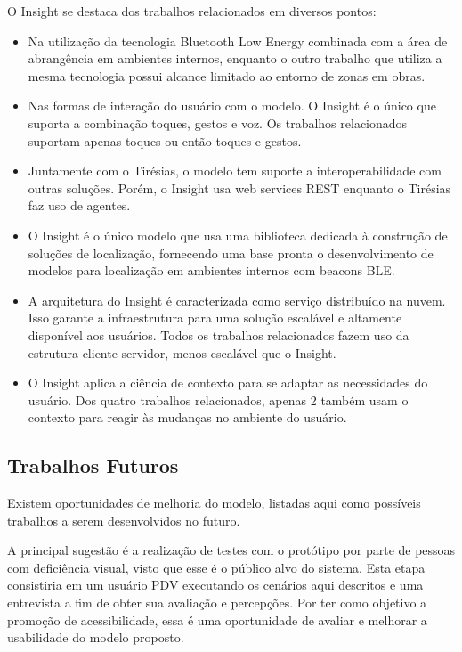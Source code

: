 \documentclass[twoside,english,brazilian]{UNISINOSartigo}
\begin{document}
O Insight se destaca dos trabalhos relacionados em diversos pontos:
\begin{itemize}
	\item Na utilização da tecnologia Bluetooth Low Energy combinada com a área de abrangência em ambientes internos, enquanto o outro trabalho que utiliza a mesma tecnologia possui alcance limitado ao entorno de zonas em obras.

	\item Nas formas de interação do usuário com o modelo. O Insight é o único que suporta a combinação toques, gestos e voz. Os trabalhos relacionados suportam apenas toques ou então toques e gestos.

	\item Juntamente com o Tirésias, o modelo tem suporte a interoperabilidade com outras soluções. Porém, o Insight usa web services REST enquanto o Tirésias faz uso de agentes.

	\item O Insight é o único modelo que usa uma biblioteca dedicada à construção de soluções de localização, fornecendo uma base pronta o desenvolvimento de modelos para localização em ambientes internos com beacons BLE.

	\item A arquitetura do Insight é caracterizada como serviço distribuído na nuvem. Isso garante a infraestrutura para uma solução escalável e altamente disponível aos usuários. Todos os trabalhos relacionados fazem uso da estrutura cliente-servidor, menos escalável que o Insight.

	\item O Insight aplica a ciência de contexto para se adaptar as necessidades do usuário. Dos quatro trabalhos relacionados, apenas 2 também usam o contexto para reagir às mudanças no ambiente do usuário.
\end{itemize}

\subsection{Trabalhos Futuros}
Existem oportunidades de melhoria do modelo, listadas aqui como possíveis trabalhos a serem desenvolvidos no futuro.

A principal sugestão é a realização de testes com o protótipo por parte de pessoas com deficiência visual, visto que esse é o público alvo do sistema. Esta etapa consistiria em um usuário PDV executando os cenários aqui descritos e uma entrevista a fim de obter sua avaliação e percepções. Por ter como objetivo a promoção de acessibilidade, essa é uma oportunidade de avaliar e melhorar a usabilidade do modelo proposto.
\end{document}
